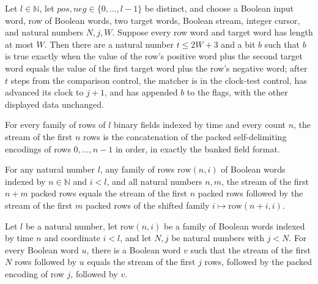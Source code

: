 \begin{lemma}
\label{Complexity.clMatch_compare}
\leanok
{}
Let $l\in\mathbb{N}$, let $pos,neg\in\{0,\ldots,l-1\}$ be distinct, and choose a Boolean
input word, row of Boolean words, two target words, Boolean stream, integer cursor, and
natural numbers $N,j,W$. Suppose every row word and target word has length at most $W$.
Then there are a natural number $t\le 2W+3$ and a bit $b$ such that $b$ is true exactly
when the value of the row's positive word plus the second target word equals the value
of the first target word plus the row's negative word; after $t$ steps from the
comparison control, the matcher is in the clock-test control, has advanced its clock to
$j+1$, and has appended $b$ to the flags, with the other displayed data unchanged.
\end{lemma}

\begin{definition}
\label{Complexity.clRows}
\leanok
{}
For every family of rows of $l$ binary fields indexed by time and every count $n$, the stream of the first $n$ rows is the concatenation of the packed self-delimiting encodings of rows $0, \dots, n-1$ in order, in exactly the banked field format.
\end{definition}

\begin{lemma}
\label{Complexity.clRows_add}
\leanok
{}
For any natural number $l$, any family of rows $\mathrm{row}(n,i)$ of Boolean words
indexed by $n\in\mathbb N$ and $i<l$, and all natural numbers $n,m$, the stream of the
first $n+m$ packed rows equals the stream of the first $n$ packed rows followed by the
stream of the first $m$ packed rows of the shifted family $i\mapsto\mathrm{row}(n+i,i)$.
\end{lemma}

\begin{lemma}
\label{Complexity.clRows_split}
\leanok
{}
Let $l$ be a natural number, let $\mathrm{row}(n,i)$ be a family of Boolean words
indexed by time $n$ and coordinate $i<l$, and let $N,j$ be natural numbers with $j<N$.
For every Boolean word $u$, there is a Boolean word $v$ such that the stream of the
first $N$ rows followed by $u$ equals the stream of the first $j$ rows, followed by the
packed encoding of row $j$, followed by $v$.
\end{lemma}

